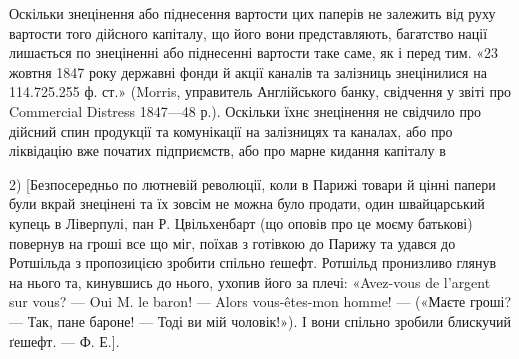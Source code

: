 Оскільки знецінення або піднесення вартости цих паперів не залежить
від руху вартости того дійсного капіталу, що його вони представляють, багатство
нації лишається по знеціненні або піднесенні вартости таке саме, як і перед
тим. «23 жовтня 1847 року державні фонди й акції каналів та залізниць знецінилися
на 114.725.255 ф. ст.» (Morris, управитель Англійського банку, свідчення
у звіті про Commercial Distress 1847—48 р.). Оскільки їхнє знецінення не
свідчило про дійсний спин продукції та комунікації на залізницях та каналах,
або про ліквідацію вже початих підприємств, або про марне кидання капіталу в

2) [Безпосередньо по лютневій революції, коли в Парижі товари й цінні папери були вкрай
знецінені та їх зовсім не можна було продати, один швайцарський купець в Ліверпулі, пан Р.
Цвільхенбарт
(що оповів про це моєму батькові) повернув на гроші все що міг, поїхав з готівкою до Парижу
та удався до Ротшільда з пропозицією зробити спільно ґешефт. Ротшільд пронизливо глянув на нього та,
кинувшись до нього, ухопив його за плечі: «Avez-vous de l’argent sur vous? — Oui M. le baron! —
Alors vous-êtes-mon homme! — («Маєте гроші? — Так, пане бароне! — Тоді ви мій чоловік!»).
І вони спільно зробили блискучий ґешефт. — Ф. Е.].
\parbreak{}  %
